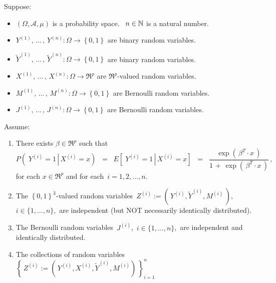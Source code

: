 \vskip 0.5cm
\begin{theorem}\label{ThmLogisticRegressionWithIncorrectData}
\mbox{}\vskip 0.1cm\noindent
Suppose:
\begin{itemize}
\item
	$\left(\Omega,\mathcal{A},\mu\right)$ is a probability space.
	\,
	$n \in \mathbb{N}$ is a natural number.
\item
	$Y^{(1)}, \,\ldots\,,\, Y^{(n)} : \Omega \longrightarrow \left\{0,1\right\}$
	are binary random variables.
\item
	$\widetilde{Y}^{(1)}, \,\ldots\,,\, \widetilde{Y}^{(n)} : \Omega \longrightarrow \left\{0,1\right\}$
	are binary random variables.
\item
	$X^{(1)}, \,\ldots\,,\, X^{(n)} : \Omega \longrightarrow \Re^{p}$
	are $\Re^{p}$-valued random variables.
\item
	$M^{(1)}, \,\ldots\,,\, M^{(n)} : \Omega \longrightarrow \left\{0,1\right\}$
	are Bernoulli random variables.
\item
	$J^{(1)}, \,\ldots\,,\, J^{(n)} : \Omega \longrightarrow \left\{0,1\right\}$
	are Bernoulli random variables.
\end{itemize}
Assume:
\renewcommand{\theenumi}{\alph{enumi}}
\renewcommand{\labelenumi}{\textnormal{(\theenumi)}$\;\;$}
\begin{enumerate}
\item
	There exists $\beta \in \Re^{p}$ such that
	\begin{equation*}
		P\!\left(\; Y^{(i)} = 1 \,\left\vert\, X^{(i)} = x \right.\right)
	\;\; = \;\;
		E\!\left[\; Y^{(i)}  = 1 \,\left\vert\, X^{(i)} = x \right.\right]
	\;\; = \;\;
		\dfrac{
			\exp\!\left(\,\beta^{T} \cdot x \,\right)
			}{
			1 \,+\, \exp\!\left(\,\beta^{T} \cdot x \,\right)
			}\,,
	\quad
	\end{equation*}
	for each $x \in \Re^{p}$ and for each \,$i = 1,2,\ldots,n$.
\item\label{iIndependence}
	The $\left\{0,1\right\}^{3}$-valued random variables
	\,$Z^{(i)} := \left(\,Y^{(i)},\widetilde{Y}^{(i)},M^{(i)}\,\right)$,
	\,$i \in \{1, \ldots, n\}$,
	\,are independent (but NOT necessarily identically distributed).
\item\label{Jindependence}
	The Bernoulli random variables \,$J^{(i)}$, \,$i \in \{1, \ldots, n\}$, \,are independent and identically distributed.
\item\label{ZJindependence}
	The collections of random variables
	\,$\left\{\,Z^{(i)} := \left(\,Y^{(i)},X^{(i)},\widetilde{Y}^{(i)},M^{(i)}\right)\,\right\}_{i=1}^{n}$\,

\end{enumerate}
\end{theorem}
